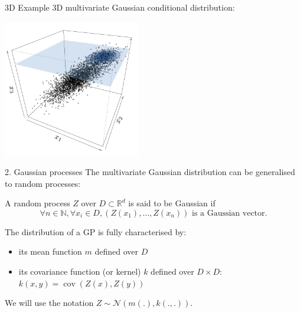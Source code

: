 \documentclass{beamer}
\DeclareMathOperator*{\Cov}{cov}
\begin{document}
\begin{frame}{}
\begin{exampleblock}{3D Example}
3D multivariate Gaussian conditional distribution:\\
\begin{center}
\includegraphics[height=6cm]{figures/ch1_condpdf2}
\end{center}
\end{exampleblock}
\end{frame}



\begin{frame}{2. Gaussian processes}
The multivariate Gaussian distribution can be generalised to random processes:
\begin{definition}
A random process $Z$ over $D \subset \mathds{R}^d$ is said to be Gaussian if
\begin{equation*}
\forall n \in \mathds{N}, \forall x_i \in D, (Z(x_1),\dots,Z(x_n)) \text{  is a Gaussian vector}.
\end{equation*}
\end{definition}
The distribution of a GP is fully characterised by:
\begin{itemize}
	\item its mean function $m$ defined over $D$
	\item its covariance function (or kernel) $k$ defined over $D \times D$: $k(x,y) = \Cov(Z(x),Z(y))$
\end{itemize}
We will use the notation $Z \sim \mathcal{N}(m(.),k(.,.))$.\\
\end{frame}
\end{document}
